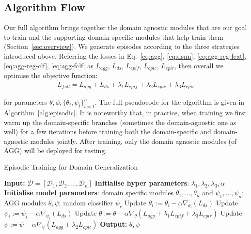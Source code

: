 \documentclass[10pt,twocolumn,letterpaper]{article}
\begin{document}
\subsection{Algorithm Flow}
Our full algorithm brings together the domain agnostic modules that are our goal to train and the supporting domain-specific modules that help train them (Section~\ref{sec:overview}). We generate episodes according to the three strategies introduced above. Referring the losses in Eq.~\ref{eq:agg}, \ref{eq:dsnn}, \ref{eq:agg-reg-feat}, \ref{eq:agg-reg-clf}, \ref{eq:agg-fclf} as $L_{agg}$, $L_{ds}$, $L_{epif}$, $L_{epic}$, $L_{epir}$, then overall we optimise the objective function:
\begin{equation}
\begin{aligned}
\label{eq:overall}
L_{full}=L_{agg}+L_{ds}+\lambda_1L_{epif}+\lambda_2L_{epic}+\lambda_3L_{epir}
\end{aligned}
\end{equation}

\noindent for parameters $\theta,\phi,\{\theta_i,\psi_i\}_{i=1}^n$. The full pseudocode for the algorithm is given in Algorithm~\ref{alg:episodic}.  It is noteworthy that, in practice,  when training we first warm up the domain-specific branches (sometimes the domain-agnostic one as well) for a few iterations before training both the domain-specific and domain-agnostic modules jointly. {After training, only the domain agnostic modules (of AGG) will be deployed for testing.} 



\begin{algorithm}[t]
\caption{Episodic Training for Domain Generalization}\label{alg:episodic}
\begin{algorithmic}[1]
\State \textbf{Input:} $\mathcal{D} = [\mathcal{D}_1, \mathcal{D}_2, \dots, \mathcal{D}_n]$
\State \textbf{Initialise hyper parameters}: $\lambda_1, \lambda_2, \lambda_3, \alpha$
\State \textbf{Initialise model parameters}: 
domain specific modules $\theta_1, ..., \theta_n$ and $\psi_1, ..., \psi_n$; AGG modules $\theta, \psi$; random classifier $\psi_r$
\State Update $\theta_i:= \theta_i - \alpha \nabla_{\theta_i}(L_{ds})$
\State Update $\psi_i:= \psi_i - \alpha \nabla_{\psi_i}(L_{ds})$
\EndFor
\State Update $\theta := \theta - \alpha \nabla_{\theta}(L_{agg} + \lambda_1 L_{epif} + \lambda_3 L_{epir})$
\State Update $\psi := \psi - \alpha \nabla_{\psi} (L_{agg} + \lambda_2 L_{epic})$
\EndWhile
\State \textbf{Output:} $\theta, \psi$
\end{algorithmic}
\end{algorithm}
\end{document}
